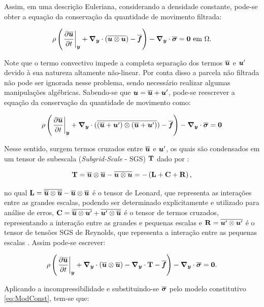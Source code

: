 Assim, em uma descrição Euleriana, considerando a densidade constante, pode-se obter a equação da conservação da quantidade de movimento filtrada:

\begin{equation}
    \rho\left({\left.\frac{\partial \overline{\boldsymbol{u}}}{\partial t}\right|_{\boldsymbol{y}}+\boldsymbol{\nabla_y}\cdot(\overline{\boldsymbol{u}\otimes\boldsymbol{u}})-\overline{\boldsymbol{f}}}\right)-\boldsymbol{\nabla_y}\cdot\overline{\boldsymbol{\sigma}}=\boldsymbol{0}\text{ em }\Omega\text{.}
\end{equation}

Note que o termo convectivo impede a completa separação dos termos $\overline{\boldsymbol{u}}$ e $\boldsymbol{u}'$ devido à sua natureza altamente não-linear. Por conta disso a parcela não filtrada não pode ser ignorada nesse problema, sendo necessário realizar algumas manipulações algébricas. Sabendo-se que $\boldsymbol{u}=\overline{\boldsymbol{u}}+\boldsymbol{u}'$, pode-se reescrever a equação da conservação da quantidade de movimento como:

\begin{equation}
    \rho\left({\left.\frac{\partial \overline{\boldsymbol{u}}}{\partial t}\right|_{\boldsymbol{y}}+\boldsymbol{\nabla_y}\cdot(\overline{(\overline{\boldsymbol{u}}+\boldsymbol{u}')\otimes(\overline{\boldsymbol{u}}+\boldsymbol{u}')})-\overline{\boldsymbol{f}}}\right)-\boldsymbol{\nabla_y}\cdot\overline{\boldsymbol{\sigma}}=\boldsymbol{0}
\end{equation}

Nesse sentido, surgem termos cruzados entre $\overline{\boldsymbol{u}}$ e $\boldsymbol{u}'$, os quais são condensados em um tensor de subescala (\textit{Subgrid-Scale} - SGS) $\mathbf{T}$ dado por \cite{piomelli1999large,hughes2000large}:

\begin{equation}
    \mathbf{T}=\overline{\boldsymbol{u}}\otimes\overline{\boldsymbol{u}}-\overline{\boldsymbol{u}\otimes\boldsymbol{u}}=-\left({\mathbf{L}+\mathbf{C}+\mathbf{R}}\right)\text{,}
\end{equation}

\noindent no qual $\mathbf{L}=\overline{\overline{\boldsymbol{u}}\otimes\overline{\boldsymbol{u}}}-\overline{\boldsymbol{u}}\otimes\overline{\boldsymbol{u}}$ é o tensor de Leonard, que representa as interações entre as grandes escalas, podendo ser determinado explicitamente e utilizado para análise de erros, $\mathbf{C}=\overline{\overline{\boldsymbol{u}}\otimes\boldsymbol{u}'}+\overline{\boldsymbol{u}'\otimes\overline{\boldsymbol{u}}}$ é o tensor de termos cruzados, representando a interação entre as grandes e pequenas escalas e $\mathbf{R}=\overline{\boldsymbol{u}'\otimes\boldsymbol{u}'}$ é o tensor de tensões SGS de Reynolds, que representa a interação entre as pequenas escalas \cite{piomelli1999large}. Assim pode-se escrever:

\begin{equation}
    \rho\left({\left.\frac{\partial \overline{\boldsymbol{u}}}{\partial t}\right|_{\boldsymbol{y}}+\boldsymbol{\nabla_y}\cdot(\overline{\boldsymbol{u}}\otimes\overline{\boldsymbol{u}})-\boldsymbol{\nabla_y}\cdot\mathbf{T}-\overline{\boldsymbol{f}}}\right)-\boldsymbol{\nabla_y}\cdot\overline{\boldsymbol{\sigma}}=\boldsymbol{0}\text{.}
\end{equation}

Aplicando a incompressibilidade e substituindo-se $\overline{\boldsymbol{\sigma}}$ pelo modelo constitutivo \eqref{eq:ModConst}, tem-se que:

